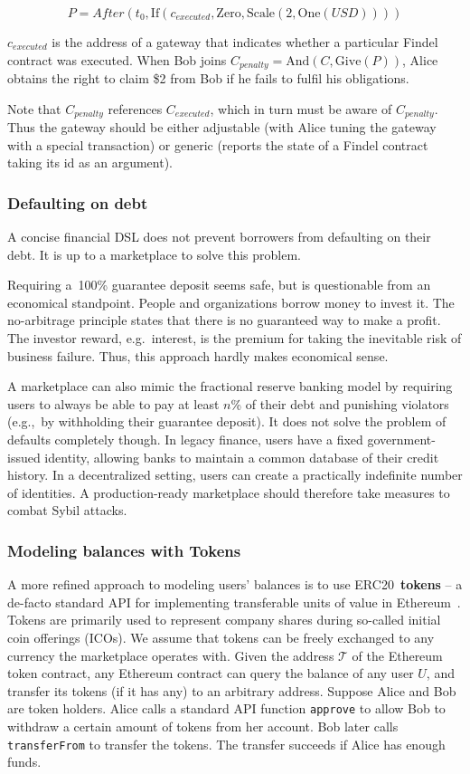 \[P=After(t_0,\mathrm{If}(c_{executed},\mathrm{Zero},\mathrm{Scale}(2,\mathrm{One}(USD))))\]

\(c_{executed}\) is the address of a gateway that indicates whether a particular Findel contract was executed.
When Bob joins \(C_{penalty}=\mathrm{And}(C,\mathrm{Give}(P))\), Alice obtains the right to claim \$2 from Bob if he fails to fulfil his obligations.

Note that \(C_{penalty}\) references \(C_{executed}\), which in turn must be aware of \(C_{penalty}\).
Thus the gateway should be either adjustable (with Alice tuning the gateway with a special transaction) or generic (reports the state of a Findel contract taking its id as an argument).


\subsubsection{Defaulting on debt}

A concise financial DSL does not prevent borrowers from defaulting on their debt.
It is up to a marketplace to solve this problem.

Requiring a~100\% guarantee deposit seems safe, but is questionable from an economical standpoint.
People and organizations borrow money to invest it.
The no-arbitrage principle states that there is no guaranteed way to make a profit.
The investor reward, e.g.~interest, is the premium for taking the inevitable risk of business failure.
Thus, this approach hardly makes economical sense.

A marketplace can also mimic the fractional reserve banking model by requiring users to always be able to pay at least $n$\% of their debt and punishing violators (e.g.,~by withholding their guarantee deposit).
It does not solve the problem of defaults completely though.
In legacy finance, users have a fixed government-issued identity, allowing banks to maintain a common database of their credit history.
In a decentralized setting, users can create a practically indefinite number of identities.
A production-ready marketplace should therefore take measures to combat Sybil attacks.


\subsubsection{Modeling balances with Tokens}

A more refined approach to modeling users' balances is to use ERC20~\textbf{tokens} -- a de-facto standard API for implementing transferable units of value in Ethereum~\cite{Victor2019}.
Tokens are primarily used to represent company shares during so-called initial coin offerings (ICOs).
We assume that tokens can be freely exchanged to any currency the marketplace operates with.
Given the address $\mathcal{T}$ of the Ethereum token contract, any Ethereum contract can query the balance of any user $U$, and transfer its tokens (if it has any) to an arbitrary address.
Suppose Alice and Bob are token holders.
Alice calls a standard API function \texttt{approve} to allow Bob to withdraw a certain amount of tokens from her account.
Bob later calls \texttt{transferFrom} to transfer the tokens.
The transfer succeeds if Alice has enough funds.

